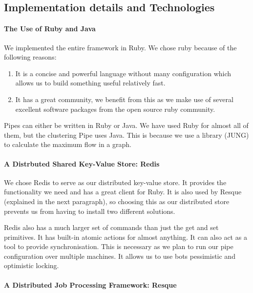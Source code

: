 \subsection{Implementation details and Technologies}

\paragraph{The Use of Ruby and Java}

We implemented the entire framework in Ruby. We chose ruby because of the following reasons:

\begin{enumerate}
\item It is a concise and powerful language without many configuration which allows us to build something useful relatively fast.
\item It has a great community, we benefit from this as we make use of several excellent software packages from the open source ruby community.
\end{enumerate}

Pipes can either be written in Ruby or Java. We have used Ruby for almost all of them, but the clustering Pipe uses Java. This is because we use a library (JUNG) to calculate the maximum flow in a graph.

\paragraph{A Distrbuted Shared Key-Value Store: Redis}

We chose Redis to serve as our distributed key-value store. It provides the functionality we need and has a great client for Ruby. It is also used by Resque (explained in the next paragraph), so choosing this as our distributed store prevents us from having to install two different solutions.

Redis also has a much larger set of commands than just the get and set primitives. It has built-in atomic actions for almost anything. It can also act as a tool to provide synchronisation. This is necessary as we plan to run our pipe configuration over multiple machines. It allows us to use bots pessimistic and optimistic locking.

\paragraph{A Distributed Job Processing Framework: Resque}

